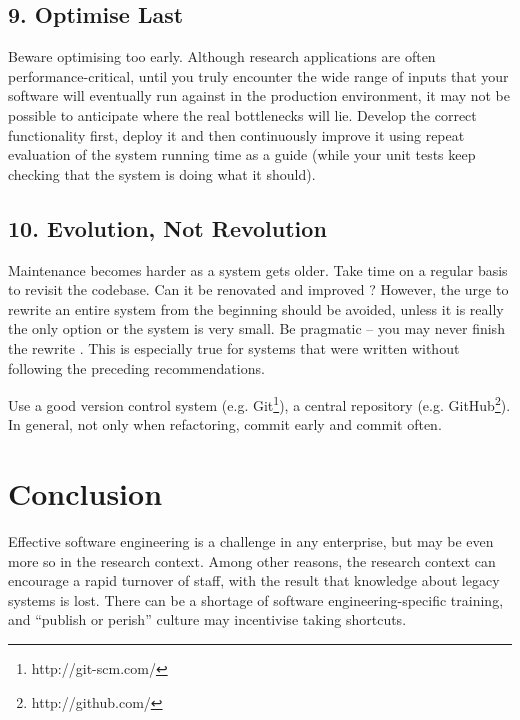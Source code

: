 \documentclass{bmcart}
\begin{document}
\subsection*{9. Optimise Last}

Beware optimising too early. Although research applications are often performance-critical, until you truly encounter the wide range of inputs that your software will eventually run against in the production environment, it may not be possible to anticipate where the real bottlenecks will lie. Develop the correct functionality first, deploy it and then continuously improve it using repeat evaluation of the system running time as a guide (while your unit tests keep checking that the system is doing what it should). 

\subsection*{10. Evolution, Not Revolution}

Maintenance becomes harder as a system gets older. Take time on a regular basis to revisit the codebase. Can it be renovated and improved \cite{refactoring}? However, the urge to rewrite an entire system from the beginning should be avoided, unless it is really the only option or the system is very small. Be pragmatic \cite{pragprog} -- you may never finish the rewrite \cite{brooks1975}. This is especially true for systems that were written without following the preceding recommendations. 

Use a good version control system (e.g. Git\footnote{http://git-scm.com/}), a central repository (e.g. GitHub\footnote{http://github.com/}). In general, not only when refactoring, commit early and commit often. 


\section*{Conclusion}

Effective software engineering is a challenge in any enterprise, but may be even more so in the research context. Among other reasons, the research context can encourage a rapid turnover of staff, with the result that knowledge about legacy systems is lost. There can be a shortage of software engineering-specific training, and ``publish or perish'' culture may incentivise taking shortcuts. 
\end{document}
